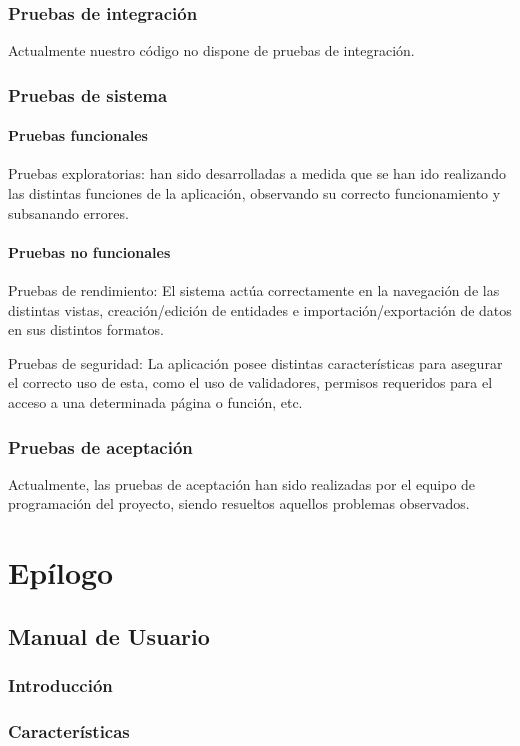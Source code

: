 \documentclass[12pt,letterpaper]{report}
\begin{document}
	\subsection{Pruebas de integración}
	Actualmente nuestro código no dispone de pruebas de integración.
	\subsection{Pruebas de sistema}
		\subsubsection{Pruebas funcionales}
Pruebas exploratorias: han sido desarrolladas a medida que se han ido realizando las distintas funciones de la aplicación, observando su correcto funcionamiento y subsanando errores.
		\subsubsection{Pruebas no funcionales}
		Pruebas de rendimiento: El sistema actúa correctamente en la navegación de las distintas vistas, creación/edición de entidades e importación/exportación de datos en sus distintos formatos.

Pruebas de seguridad: La aplicación posee distintas características para asegurar el correcto uso de esta, como el uso de validadores, permisos requeridos para el acceso a una determinada página o función, etc.
	\subsection{Pruebas de aceptación}
	Actualmente, las pruebas de aceptación han sido realizadas por el equipo de programación del proyecto, siendo resueltos aquellos problemas observados.
\chapter{Epílogo}
\section{Manual de Usuario}
	\subsection{Introducción}

	\subsection{Características}
\end{document}

